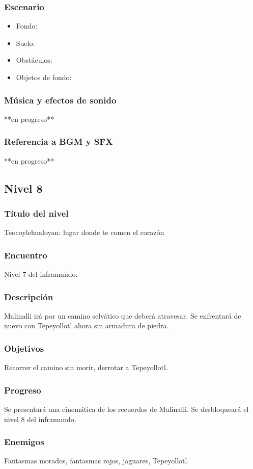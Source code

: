 \documentclass[11pt,letterpaper]{article}
\begin{document}
	\subsubsection{Escenario}
\begin{itemize} 
	\item Fondo:
	\item Suelo:
	\item Obstáculos:
	\item Objetos de fondo:
\end{itemize}	
	\subsubsection{Música y efectos de sonido}
	**en progreso**
	\subsubsection{Referencia a BGM y SFX}
	**en progreso**
	
	
		\subsection{Nivel 8}
	\subsubsection{Título del nivel}
	Teocoylehualoyan: lugar donde te comen el corazón
	\subsubsection{Encuentro}
	Nivel 7 del inframundo.
	\subsubsection{Descripción}
	Malinalli irá por un camino selvático que deberá atravesar. Se enfrentará de nuevo con Tepeyollotl ahora sin armadura de piedra.
	\subsubsection{Objetivos}
	Recorrer el camino sin morir, derrotar a Tepeyollotl.
	\subsubsection{Progreso}
	Se presentará una cinemática de los recuerdos de Malinalli. Se desbloqueará el nivel 8 del inframundo.
	\subsubsection{Enemigos}
	Fantasmas morados, fantasmas rojos, jaguares, Tepeyollotl.
\end{document}
